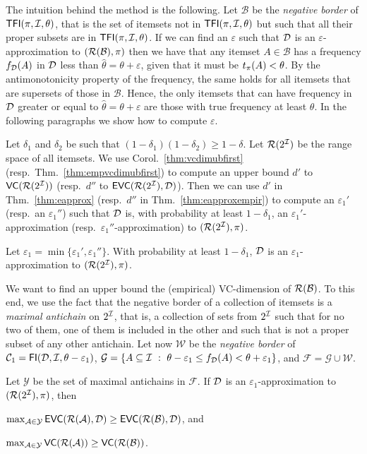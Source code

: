 The intuition behind the method is the following. 
Let $\mathcal{B}$ be
the \emph{negative border} of $\mathsf{TFI}(\pi,{\cal I},\theta)$, that is the set of itemsets
not in $\mathsf{TFI}(\pi,{\cal I},\theta)$ but such that all their proper subsets are in
$\mathsf{TFI}(\pi,{\cal I},\theta)$. If we can find an $\varepsilon$ such that ${\cal D}$ is an
$\varepsilon$-approximation to $(\mathcal{R}(\mathcal{B}),\pi)$ then 
we have that any itemset
$A\in\mathcal{B}$ has a frequency $f_{\cal D}(A)$ in ${\cal D}$ less than
$\hat{\theta}=\theta+\varepsilon$, given that it must be $t_\pi(A)<\theta$. By the
antimonotonicity property of the frequency, the same holds for all itemsets that
are supersets of those in $\mathcal{B}$. Hence, the only itemsets that can have
frequency in ${\cal D}$ greater or equal to $\hat{\theta}=\theta+\varepsilon$ are
those with true frequency at least $\theta$. In the following paragraphs we show
how to compute $\varepsilon$.

Let $\delta_1$ and $\delta_2$ be such that $(1-\delta_1)(1-\delta_2)\ge
1-\delta$. Let $\mathcal{R}(2^{\cal I})$ be the range space of all itemsets.
We use Corol.~\ref{thm:vcdimubfirst} (resp.~Thm.~\ref{thm:empvcdimubfirst}) to
compute an upper bound $d'$ to $\mathsf{VC}(\mathcal{R}(2^{\cal I}))$ (resp.~$d''$ to
$\mathsf{EVC}(\mathcal{R}(2^{\cal I}),{\cal D})$). Then we can use $d'$ in Thm.~\ref{thm:eapprox} (resp.~$d''$ in
Thm.~\ref{thm:eapproxempir}) to compute an $\varepsilon_1'$ (resp.~an
$\varepsilon_1''$) such that ${\cal D}$ is, with probability at
least $1-\delta_1$, an $\varepsilon_1'$-approximation
(resp.~$\varepsilon_1''$-approximation) to $(\mathcal{R}(2^{\cal I}),\pi)$.
\begin{fact}
Let
$\varepsilon_1=\min\{\varepsilon_1',\varepsilon_1''\}$. With probability at
least $1-\delta_1$, ${\cal D}$ is an $\varepsilon_1$-approximation to
$(\mathcal{R}(2^{\cal I}),\pi)$.
\end{fact}

We want to find an upper bound the (empirical) VC-dimension of
$\mathcal{R}(\mathcal{B})$. To this end, we use the fact that the negative border of a
collection of itemsets is a \emph{maximal
antichain} on $2^{\cal I}$, that is, a collection of sets from $2^{\cal I}$ such that
for no two of them, one of them is included in the other and such that is not a
proper subset of any other antichain. Let now $\mathcal{W}$ be the \emph{negative
border} of $\mathcal{C}_1=\mathsf{FI}({\cal D},{\cal I},\theta-\varepsilon_1)$, 
$\mathcal{G}=\{A\subseteq{\cal I} ~:~ \theta-\varepsilon_1\le
f_{\cal D}(A)<\theta+\varepsilon_1\}$, and $\mathcal{F}=\mathcal{G}\cup\mathcal{W}$.

\begin{lemma}\label{lem:antichains}
  Let $\mathcal{Y}$ be the set of maximal antichains in $\mathcal{F}$. If
  ${\cal D}$ is an $\varepsilon_1$-approximation to $(\mathcal{R}(2^{\cal I}),\pi)$, then
  \begin{enumerate*}
    \item
      $\max_{\mathcal{A}\in\mathcal{Y}}\mathsf{EVC}(\mathcal{R}(\mathcal{A}),{\cal D})\ge\mathsf{EVC}(\mathcal{R}(\mathcal{B}),{\cal D})$,
      and
    \item
      $\max_{\mathcal{A}\in\mathcal{Y}}\mathsf{VC}(\mathcal{R}(\mathcal{A}))\ge\mathsf{VC}(\mathcal{R}(\mathcal{B}))$.
  \end{enumerate*}
\end{lemma}

